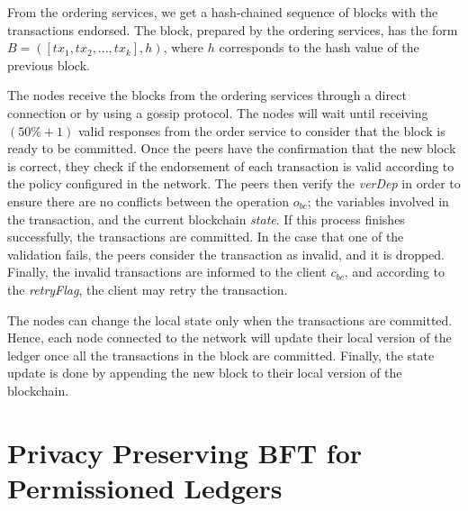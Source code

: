 \documentclass[conference]{llncs}
\newcommand{\name}{BlindCons}
\begin{document}
\begin{figure*}[tb]
{}
\caption{\name{} ordering service}
\label{dia:ord}
\end{figure*}

From the ordering services, we get a hash-chained sequence of blocks with the transactions endorsed. The block, prepared by the ordering services, has the form $B=\left(\left[tx_1,tx_2,...,tx_k\right],h\right)$, where $h$ corresponds to the hash value of the previous block.

The nodes receive the blocks from the ordering services through a direct connection or by using a gossip protocol. The nodes will wait until receiving $(50\%+1)$ valid responses from the order service to consider that the block is ready to be committed. Once the peers have the confirmation that the new block is correct, they check if the endorsement of each transaction is valid according to the policy configured in the network. The peers then verify the \textit{verDep} in order to ensure there are no conflicts between the operation $o_{bc}$; the variables involved in the transaction, and the current blockchain \textit{state}. If this process finishes successfully, the transactions are committed. In the case that one of the validation fails, the peers consider the transaction as invalid, and it is dropped. Finally, the invalid transactions are informed to the client $c_{bc}$, and according to the \textit{retryFlag}, the client may retry the transaction.

The nodes can change the local state only when the transactions are committed. Hence, each node connected to the network will update their local version of the ledger once all the transactions in the block are committed. Finally, the state update is done by appending the new block to their local version of the blockchain.

\section{Privacy Preserving BFT for Permissioned Ledgers}\label{PPPBFT}
\end{document}
